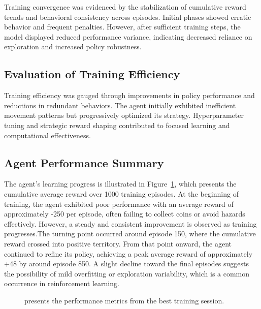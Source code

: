 \documentclass[12pt,oneside,openright,a4paper]{cpe-english-project}
\begin{document}
Training convergence was evidenced by the stabilization of cumulative reward trends and behavioral consistency across episodes. Initial phases showed erratic behavior and frequent penalties. However, after sufficient training steps, the model displayed reduced performance variance, indicating decreased reliance on exploration and increased policy robustness.

\subsection{Evaluation of Training Efficiency}

Training efficiency was gauged through improvements in policy performance and reductions in redundant behaviors. The agent initially exhibited inefficient movement patterns but progressively optimized its strategy. Hyperparameter tuning and strategic reward shaping contributed to focused learning and computational effectiveness.

\subsection{Agent Performance Summary}
The agent’s learning progress is illustrated in Figure~\ref{fig:reward_progress}, which presents the cumulative average reward over 1000 training episodes. At the beginning of training, the agent exhibited poor performance with an average reward of approximately -250 per episode, often failing to collect coins or avoid hazards effectively. However, a steady and consistent improvement is observed as training progresses.The turning point occurred around episode 150, where the cumulative reward crossed into positive territory. From that point onward, the agent continued to refine its policy, achieving a peak average reward of approximately +48 by around episode 850. A slight decline toward the final episodes suggests the possibility of mild overfitting or exploration variability, which is a common occurrence in reinforcement learning.

\begin{figure}[H]
\centering
{}
\caption{ presents the performance metrics from the best training session.}
\label{fig:reward_progress}
\end{figure}
\end{document}
